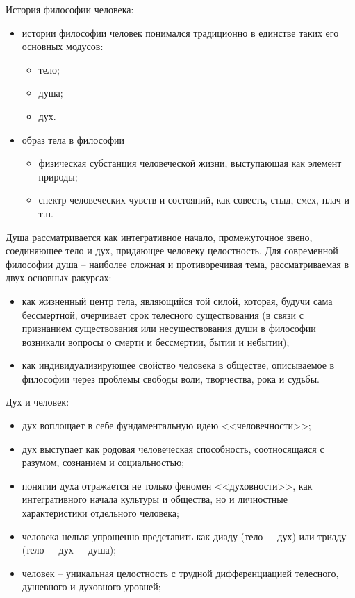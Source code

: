 История философии человека:
\begin{itemize}
    \itemsep-1ex
    \vspace*{-1ex}
    \item истории философии человек понимался традиционно в единстве таких его основных модусов:
    \begin{itemize}
        \itemsep-.5ex
        \vspace*{-1ex}
        \item тело;
        \item душа;
        \item дух.
    \end{itemize}
    \item образ тела в философии
    \begin{itemize}
        \itemsep-.5ex
        \vspace*{-1ex}
        \item физическая субстанция человеческой жизни, выступающая как элемент природы;
        \item спектр человеческих чувств и состояний, как совесть, стыд, смех, плач и т.п. 
    \end{itemize}
\end{itemize}

Душа рассматривается как интегративное начало, промежуточное звено, соединяющее тело и дух, придающее 
человеку целостность. Для современной философии душа -- наиболее сложная и противоречивая тема, 
рассматриваемая в двух основных ракурсах:
\begin{itemize}
    \itemsep-1ex
    \vspace*{-1ex}
    \item как жизненный центр тела, являющийся той силой, которая, будучи сама бессмертной,  очерчивает срок 
        телесного существования (в связи с признанием существования или несуществования души 
        в философии возникали вопросы о смерти и бессмертии, бытии и небытии);
    \item как индивидуализирующее свойство человека в обществе, описываемое в философии через 
        проблемы свободы воли, творчества, рока и судьбы.
\end{itemize}

Дух и человек:
\begin{itemize}
    \itemsep-1ex
    \vspace*{-1ex}
    \item дух воплощает в себе фундаментальную идею <<человечности>>;
    \item дух выступает как родовая человеческая способность, соотносящаяся с разумом, сознанием и 
        социальностью;
    \item понятии духа отражается не только феномен <<духовности>>, как интегративного начала культуры и 
        общества, но и личностные характеристики отдельного человека;
    \item человека нельзя упрощенно представить как диаду (тело –- дух) или триаду (тело –- дух –- душа);
    \item человек -- уникальная целостность с трудной дифференциацией телесного, душевного и духовного 
        уровней; 
\end{itemize}